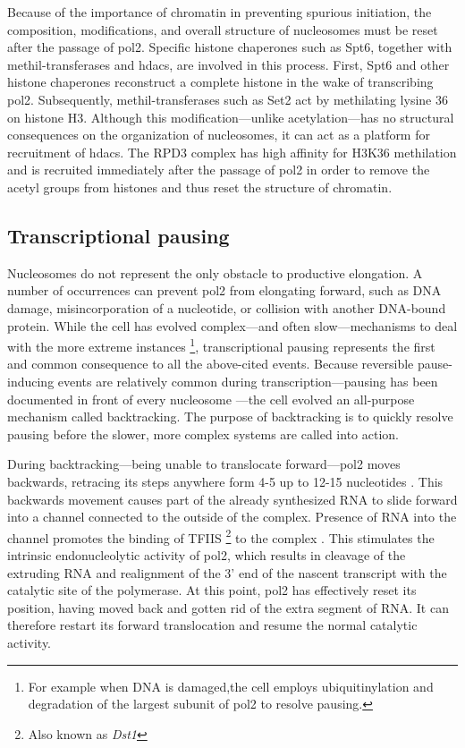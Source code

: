 Because of the importance of chromatin in preventing spurious initiation, the composition, modifications, and overall structure of nucleosomes must be reset after the passage of \gls{pol2}. 
Specific histone chaperones such as Spt6, together with methil-transferases and \gls{hdacs}, are involved in this process.
First, Spt6 and other histone chaperones reconstruct a complete histone in the wake of transcribing \gls{pol2}.
Subsequently, methil-transferases such as Set2 act by methilating lysine 36 on histone H3. 
Although this modification---unlike acetylation---has no structural consequences on the organization of nucleosomes, it can act as a platform for recruitment of \gls{hdacs}.
The RPD3 complex has high affinity for H3K36 methilation and is recruited immediately after the passage of \gls{pol2} in order to remove the acetyl groups from histones and thus reset the structure of chromatin.

\subsection{Transcriptional pausing} \label{pausing}
Nucleosomes do not represent the only obstacle to productive elongation.
A number of occurrences can prevent \gls{pol2} from elongating forward, such as DNA damage, misincorporation of a nucleotide, or collision with another DNA-bound protein.
While the cell has evolved complex---and often slow---mechanisms to deal with the more extreme instances \footnote{For example when DNA is damaged,the cell employs ubiquitinylation and degradation of the largest subunit of \gls{pol2} to resolve pausing.}, transcriptional pausing represents the first and common consequence to all the above-cited events. 
Because reversible pause-inducing events are relatively common during transcription---pausing has been documented in front of every nucleosome \citep{churchman:2011:nascent}---the cell evolved an all-purpose mechanism called backtracking.
The purpose of backtracking is to quickly resolve pausing before the slower, more complex systems are called into action. 

During backtracking---being unable to translocate forward---\gls{pol2} moves backwards, retracing its steps anywhere form 4-5 up to 12-15 nucleotides \citep{cheung:2011:structural}.
This backwards movement causes part of the already synthesized RNA to slide forward into a channel connected to the outside of the complex.
Presence of RNA into the channel promotes the binding of TFIIS \footnote{Also known as \emph{Dst1}} to the complex \citep{cheung:2011:structural}.
This stimulates the intrinsic endonucleolytic activity of \gls{pol2}, which results in cleavage of the extruding RNA and realignment of the 3' end of the nascent transcript with the catalytic site of the polymerase.
At this point, \gls{pol2} has effectively reset its position, having moved back and gotten rid of the extra segment of RNA. 
It can therefore restart its forward translocation and resume the normal catalytic activity.

